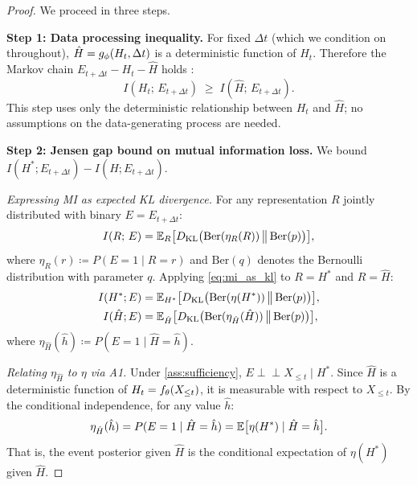 \begin{proof}
We proceed in three steps.

\textbf{Step 1: Data processing inequality.}
For fixed $\Delta t$ (which we condition on throughout), $\hat{H} = g_\phi(H_t, \Delta t)$ is a deterministic function of $H_t$.
Therefore the Markov chain $E_{t+\Delta t} - H_t - \hat{H}$ holds \citep[Thm.~2.8.1]{cover2006elements}:
\begin{equation}
\label{eq:dpi_chain}
I(H_t;\, E_{t+\Delta t}) \;\geq\; I(\hat{H};\, E_{t+\Delta t}).
\end{equation}
This step uses only the deterministic relationship between $H_t$ and $\hat{H}$; no assumptions on the data-generating process are needed.

\textbf{Step 2: Jensen gap bound on mutual information loss.}
We bound $I(H^*; E_{t+\Delta t}) - I(\hat{H}; E_{t+\Delta t})$.

\emph{Expressing MI as expected KL divergence.}
For any representation $R$ jointly distributed with binary $E = E_{t+\Delta t}$:
\begin{equation}
\label{eq:mi_as_kl}
I(R;\, E) = \mathbb{E}_R\bigl[D_{\mathrm{KL}}\bigl(\mathrm{Ber}(\eta_R(R))\,\big\|\,\mathrm{Ber}(p)\bigr)\bigr],
\end{equation}
where $\eta_R(r) \coloneqq P(E=1 \mid R=r)$ and $\mathrm{Ber}(q)$ denotes the Bernoulli distribution with parameter $q$.
Applying \eqref{eq:mi_as_kl} to $R = H^*$ and $R = \hat{H}$:
\begin{align}
I(H^*; E) &= \mathbb{E}_{H^*}\bigl[D_{\mathrm{KL}}\bigl(\mathrm{Ber}(\eta(H^*))\,\big\|\,\mathrm{Ber}(p)\bigr)\bigr], \label{eq:mi_hstar} \\
I(\hat{H}; E) &= \mathbb{E}_{\hat{H}}\bigl[D_{\mathrm{KL}}\bigl(\mathrm{Ber}(\eta_{\hat{H}}(\hat{H}))\,\big\|\,\mathrm{Ber}(p)\bigr)\bigr], \label{eq:mi_hhat}
\end{align}
where $\eta_{\hat{H}}(\hat{h}) \coloneqq P(E=1 \mid \hat{H}=\hat{h})$.

\emph{Relating $\eta_{\hat{H}}$ to $\eta$ via A1.}
Under \ref{ass:sufficiency}, $E \perp\!\!\!\perp X_{\leq t} \mid H^*$.
Since $\hat{H}$ is a deterministic function of $H_t = f_\theta(X_{\leq t})$, it is measurable with respect to $X_{\leq t}$.
By the conditional independence, for any value $\hat{h}$:
\begin{equation}
\label{eq:tower}
\eta_{\hat{H}}(\hat{h}) = P(E=1 \mid \hat{H}=\hat{h}) = \mathbb{E}\bigl[\eta(H^*) \mid \hat{H}=\hat{h}\bigr].
\end{equation}
That is, the event posterior given $\hat{H}$ is the conditional expectation of $\eta(H^*)$ given $\hat{H}$.


\end{proof}

